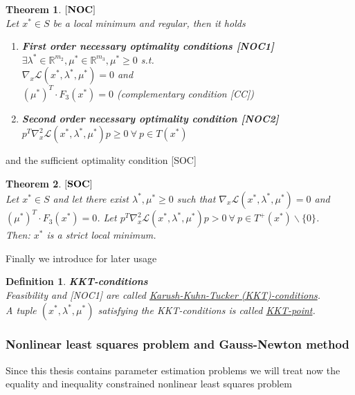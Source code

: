 \documentclass{scrartcl}[12pt, halfparskip]
\numberwithin{equation}{section}
\numberwithin{figure}{section}
\numberwithin{table}{section}
\newtheorem{Definition}{Definition}
\newtheorem{Theorem}{Theorem}
\begin{document}
\begin{Theorem}
	$[\text{\textbf{NOC}}]$ \\
	Let $x^* \in S$ be a local minimum and regular, then it holds
	\begin{enumerate}
		\item \textbf{First order necessary optimality conditions [NOC1]} \\
		$\exists \lambda^* \in \mathbb{R}^{m_2}, \mu^* \in \mathbb{R}^{m_3}, \mu^* \ge 0$ s.t. \\
		$\nabla_x \mathcal{L}(x^*, \lambda^*, \mu^*) = 0$ and \\
		$(\mu^*)^T \cdot F_3(x^*) = 0$ (complementary condition [CC])
		\item \textbf{Second order necessary optimality condition [NOC2]} \\
		$p^T \nabla_x^2 \mathcal{L}(x^*, \lambda^*, \mu^*) p \ge 0 \ \forall \ p \in T(x^*)$
	\end{enumerate}
\end{Theorem}

and the sufficient optimality condition [SOC]

\begin{Theorem}
	$[\text{\textbf{SOC}}]$ \\
	Let $x^* \in S$ and let there exist $\lambda^*, \mu^* \ge 0$ such that $\nabla_x \mathcal{L}(x^*, \lambda^*, \mu^*) = 0$ and \\ $(\mu^*)^T \cdot F_3(x^*) = 0$. 
	Let $p^T \nabla_x^2 \mathcal{L}(x^*, \lambda^*, \mu^*) p > 0 \ \forall \ p \in T^+(x^*) \backslash \{0\}$. \\
	Then: $x^*$ is a strict local minimum.
\end{Theorem}

Finally we introduce for later usage 

\begin{Definition} \textbf{KKT-conditions} \\
	Feasibility and [NOC1] are called \underline{Karush-Kuhn-Tucker (KKT)-conditions}. \\
	A tuple $(x^*, \lambda^*, \mu^*)$ satisfying the KKT-conditions is called \underline{KKT-point}.
\end{Definition}


\subsubsection{Nonlinear least squares problem and Gauss-Newton method}
\label{sec:Gauss_Newton}
Since this thesis contains parameter estimation problems we will treat now the equality and inequality constrained nonlinear least squares problem
\end{document}
